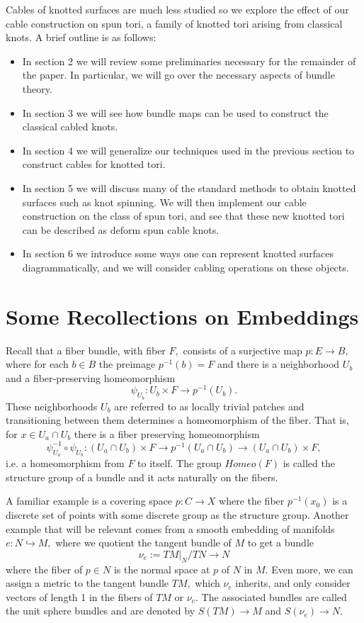 \documentclass[a4paper, 12 pt, reqno]{amsart}
\theoremstyle{definition}
\theoremstyle{remark}
\begin{document}
Cables of knotted surfaces are much less studied so we explore the effect of our cable construction on spun tori, a family of knotted tori arising from classical knots. A brief outline is as follows:
\begin{itemize}
\item In section 2 we will review some preliminaries necessary for the remainder of the paper. In particular, we will go over the necessary aspects of bundle theory.
\item In section 3 we will see how bundle maps can be used to construct the classical cabled knots.
\item In section 4 we will generalize our techniques used in the previous section to construct cables for knotted tori.
\item In section 5 we will discuss many of the standard methods to obtain knotted surfaces such as knot spinning. We will then implement our cable construction on the class of spun tori, and see that these new knotted tori can be described as deform spun cable knots.
\item In section 6 we introduce some ways one can represent knotted surfaces diagrammatically, and we will consider cabling operations on these objects. 
\end{itemize}



\section{Some Recollections on Embeddings} 


Recall that a fiber bundle, with fiber $F,$ consists of a surjective map $p: E \rightarrow B,$ where for each $b \in B$ the preimage $p^{-1}(b) = F$ and there is a neighborhood $U_{b}$ and a fiber-preserving homeomorphism $$\psi_{U_{b}}: U_{b} \times F \rightarrow p^{-1}(U_{b}).$$ These neighborhoods $U_{b}$ are referred to as locally trivial patches and transitioning between them determines a homeomorphism of the fiber. That is, for $x \in U_{a} \cap U_{b}$ there is a fiber preserving homeomorphism $$\psi_{U_{a}}^{-1} \circ \psi_{U_{b}}: (U_{a} \cap U_{b}) \times F \rightarrow p^{-1}(U_{a} \cap U_{b}) \rightarrow  (U_{a} \cap U_{b}) \times F,$$ i.e. a homeomorphism from $F$ to itself. The group $Homeo(F)$ is called the structure group of a bundle and it acts naturally on the fibers.

A familiar example is a covering space $p: C \rightarrow X$ where the fiber $p^{-1}(x_{0})$ is a discrete set of points with some discrete group as the structure group. Another example that will be relevant comes from a smooth embedding of manifolds $e: N \hookrightarrow M,$ where we quotient the tangent bundle of $M$ to get a bundle $$\nu_{e} := TM|_{N}/TN \rightarrow N$$ where the fiber of $p \in N$ is the normal space at $p$ of $N$ in $M.$ Even more, we can assign a metric to the tangent bundle $TM,$ which $\nu_{e}$ inherits, and only consider vectors of length 1 in the fibers of $TM$ or $\nu_{e}.$ The associated bundles are called the unit sphere bundles and are denoted by $S(TM) \rightarrow M$ and $S(\nu_{e}) \rightarrow N.$
\end{document}
